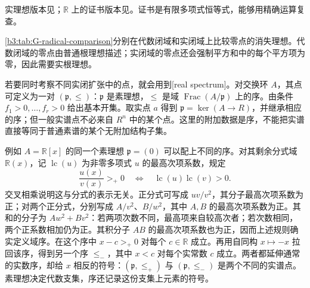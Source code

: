 实理想版本见\cite[Appendix A, Theorem A.5.15]{Mangolte2020RealAlgebraicVarieties}；\(\mathbb R\) 上的证书版本见\cite[Section 7.4, Theorem 7.5]{Sturmfels2002PolynomialEquations}。证书是有限多项式恒等式，能够用精确运算复查。

\begin{table}[htbp]
	\centering
	\caption{普通根理想与实根理想}
	\label{b3:tab:G-radical-comparison}
	
\end{table}

\cref{b3:tab:G-radical-comparison}分别在代数闭域和实闭域上比较零点的消失理想。代数闭域的零点由普通根理想描述；实闭域的零点还会强制平方和中的每个平方项为零，因此需要实根理想。

\ProseParagraphBreak
若要同时考察不同实闭扩张中的点，就会用到[real spectrum]。对交换环 \(A\)，其点可定义为一对 \((\mathfrak p,\le)\)：\(\mathfrak p\) 是素理想，\(\le\) 是域 \(\operatorname{Frac}(A/\mathfrak p)\) 上的序。由条件 \(f_1>0,\ldots,f_r>0\) 给出基本开集。取实点 \(a\) 得到 \(\mathfrak p=\ker(A\to R)\)，并继承相应的序；但一般实谱点不必来自 \(R^n\) 中的某个点。这里的附加数据是序，不能把实谱直接等同于普通素谱的某个无附加结构子集。

\ProseParagraphBreak
例如 \(A=\mathbb R[x]\) 的同一个素理想 \(\mathfrak p=(0)\) 可以配上不同的序。对其剩余分式域 \(\mathbb R(x)\)，记 \(\operatorname{lc}(u)\) 为非零多项式 \(u\) 的最高次项系数，规定
\[
	\frac{u(x)}{v(x)}>_+0 \quad\Longleftrightarrow\quad \operatorname{lc}(u)\operatorname{lc}(v)>0.
\]
交叉相乘说明这与分式的表示无关。正分式可写成 \(uv/v^2\)，其分子最高次项系数为正；对两个正分式，分别写成 \(A/v^2\)、\(B/w^2\)，其中 \(A,B\) 的最高次项系数为正。其和的分子为 \(Aw^2+Bv^2\)：若两项次数不同，最高项来自较高次者；若次数相同，两个正系数相加仍为正。其积分子 \(AB\) 的最高次项系数也为正，因而上述规则确实定义域序。在这个序中 \(x-c>_+0\) 对每个 \(c\in\mathbb R\) 成立。再用自同构 \(x\mapsto-x\) 拉回该序，得到另一个序 \(\le_-\)，其中 \(x<c\) 对每个实常数 \(c\) 成立。两者都延伸通常的实数序，却给 \(x\) 相反的符号：\((\mathfrak p,\le_+)\) 与 \((\mathfrak p,\le_-)\) 是两个不同的实谱点。素理想决定代数支集，序还记录这份支集上元素的符号。
